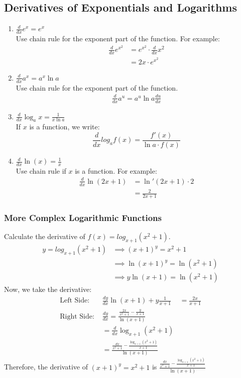 \documentclass{article}
\begin{document}
\subsection{Derivatives of Exponentials and Logarithms}
\begin{enumerate}
    \item $\frac{d}{dx} e^x = e^x$\\
    Use chain rule for the exponent part of the function. For example:
    \begin{align*}
        \frac{d}{dx} e^{x^2} & = e^{x^2} \cdot \frac{d}{dx} x^2\\
        & = 2x \cdot e^{x^2}
    \end{align*}
    \item $\frac{d}{dx} a^x = a^x \ln a$\\
    Use chain rule for the exponent part of the function.
    \begin{align*}
        \frac{d}{dx}a^u = a^u \ln a \frac{du}{dx}
    \end{align*}
    \item $\frac{d}{dx}\log_a x = \frac{1}{x \ln a}$\\
    If $x$ is a function, we write:
    $$\frac{d}{dx} log_a f(x) = \frac{f'(x)}{\ln a \cdot f(x)}$$
    \item $\frac{d}{dx} \ln(x) = \frac{1}{x}$\\
    Use chain rule if $x$ is a function. For example:
    \begin{align*}
        \frac{d}{dx} \ln(2x + 1) & = \ln'(2x + 1) \cdot 2\\
        & = \frac{2}{2x + 1}
    \end{align*}
\end{enumerate}
\subsubsection{More Complex Logarithmic Functions}
Calculate the derivative of $f(x) = log_{x + 1}(x^2 + 1)$.
\begin{align*}
    y = log_{x + 1}(x^2+1) & \implies (x+1)^y = x^2 + 1\\
    & \implies \ln(x + 1)^y = \ln(x^2 + 1)\\
    & \implies y \ln(x + 1) = \ln(x^2 + 1)
\end{align*}
Now, we take the derivative:
\begin{align*}
    \text{Left Side: }& \frac{dy}{dx}\ln(x + 1) + y \frac{1}{x + 1} & = \frac{2x}{x + 1}\\
    \text{Right Side: }& \frac{dy}{dx} = \frac{\frac{2x}{x^2 + 1} - \frac{y}{x + 1}}{\ln(x+ 1)}\\
    & = \frac{d}{dx} \log_{x + 1}(x^2+1)\\
    & = \frac{\frac{dx}{x^2 + 1} - \frac{\log_{x + 1}(x^2 + 1)}{x+1}}{\ln(x+1)}
\end{align*}
Therefore, the derivative of $(x+1)^y = x^2 + 1$ is $\frac{\frac{dx}{x^2 + 1} - \frac{\log_{x + 1}(x^2 + 1)}{x+1}}{\ln(x+1)}$\
\end{document}
